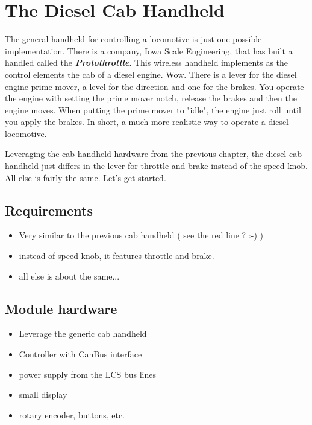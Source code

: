 \chapter{The Diesel Cab Handheld}

The general handheld for controlling a locomotive is just one possible implementation. There is a company, Iowa Scale Engineering, that has built a handled called the \textbf{\textit{Protothrottle}}. This wireless handheld implements as the control elements the cab of a diesel engine. Wow. There is a lever for the diesel engine prime mover, a level for the direction and one for the brakes. You operate the engine with setting the prime mover notch, release the brakes and then the engine moves. When putting the prime mover to "idle", the engine just roll until you apply the brakes. In short, a much more realistic way to operate a diesel locomotive.


Leveraging the cab handheld hardware from the previous chapter, the diesel cab handheld just differs in the lever for throttle and brake instead of the speed knob. All else is fairly the same. Let's get started.

\section{Requirements}

\begin{itemize}
\item Very similar to the previous cab handheld ( see the red line ? :-) )
\item instead of speed knob, it features throttle and brake.
\item all else is about the same...
\end{itemize}

\section{Module hardware}

\begin{itemize}
\item Leverage the generic cab handheld
\item Controller with CanBus interface
\item power supply from the LCS bus lines
\item small display
\item rotary encoder, buttons, etc.
\end{itemize}


